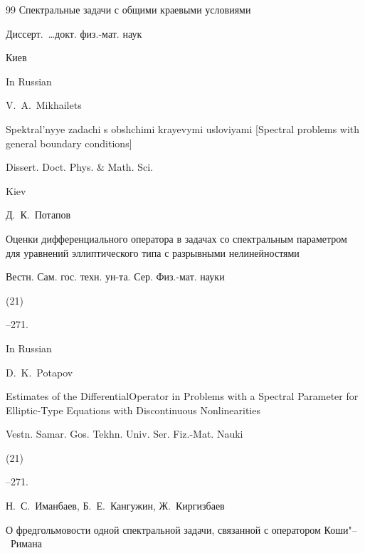 \begin{thebibliography}{99}
\thesis Спектральные задачи с общими краевыми условиями

\thesisinfo Диссерт.~\ldots докт. физ.-мат. наук

\publaddr Киев


\misctransl

\lang In Russian

\by V.~A.~Mikhailets

\thesis Spektral'nyye zadachi s obshchimi krayevymi usloviyami \rm [Spectral problems with general boundary conditions]

\thesisinfo Dissert. Doct. Phys. \& Math. Sci. \nofrills

\publaddr Kiev







\by Д.~К.~Потапов

\paper Оценки дифференциального оператора в задачах со спектральным параметром для уравнений эллиптического типа с разрывными нелинейностями

\jour Вестн. Сам. гос. техн. ун-та. Сер. Физ.-мат. науки


(21)

--271.



\misctransl

\lang In Russian

\by D.~K.~Potapov

\paper Estimates of the DifferentialOperator in Problems with a Spectral Parameter for Elliptic-Type Equations with Discontinuous Nonlinearities

\jour Vestn. Samar. Gos. Tekhn. Univ. Ser. Fiz.-Mat. Nauki


(21)

--271.






\by Н.~С.~Иманбаев, Б.~Е.~Кангужин, Ж.~Киргизбаев

\paper О фредгольмовости одной спектральной задачи, связанной с оператором Коши"--~Римана


\end{thebibliography}
